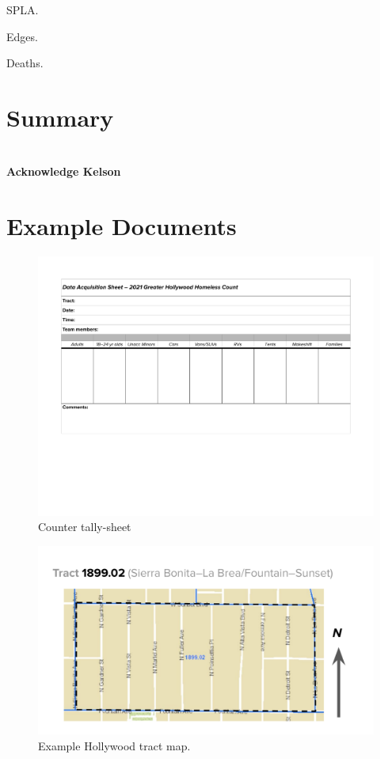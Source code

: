 \documentclass[11pt,twocolumn]{article}
\def\bfr{\bf\color{red}}
\begin{document}
SPLA.

Edges.

Deaths.

\section{Summary}
\label{sec:summary}

\section*{}

{\bfr Acknowledge Kelson}

\appendix

\section{Example Documents}

\begin{figure}
	\centering
	\includegraphics[width =\linewidth]{Hollywood2021CountDataSheet}
	\caption{Counter tally-sheet}
\end{figure}

\begin{figure}
	\centering
	\includegraphics[width =\linewidth]{tractMap}
	\caption{Example Hollywood tract map.}
\end{figure}
\end{document}
